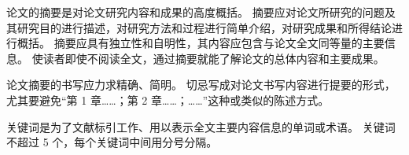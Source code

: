 
论文的摘要是对论文研究内容和成果的高度概括。
摘要应对论文所研究的问题及其研究目的进行描述，对研究方法和过程进行简单介绍，对研究成果和所得结论进行概括。
摘要应具有独立性和自明性，其内容应包含与论文全文同等量的主要信息。
使读者即使不阅读全文，通过摘要就能了解论文的总体内容和主要成果。

论文摘要的书写应力求精确、简明。
切忌写成对论文书写内容进行提要的形式，尤其要避免“第 1 章……；第 2 章……；……”这种或类似的陈述方式。

关键词是为了文献标引工作、用以表示全文主要内容信息的单词或术语。
关键词不超过 5 个，每个关键词中间用分号分隔。
